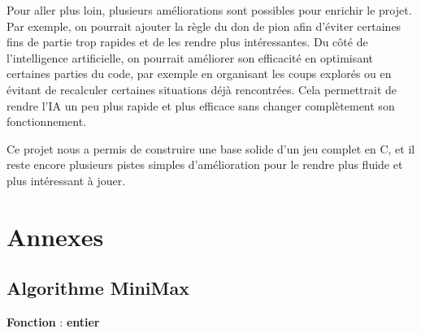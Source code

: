 \documentclass{article}
\begin{document}
Pour aller plus loin, plusieurs améliorations sont possibles pour enrichir le projet. Par exemple, on pourrait ajouter la règle du don de pion afin d'éviter certaines fins de partie trop rapides et de les rendre plus intéressantes. Du côté de l'intelligence artificielle, on pourrait  améliorer son efficacité en optimisant certaines parties du code, par exemple en organisant les coups explorés ou en évitant de recalculer certaines situations déjà rencontrées. Cela permettrait de rendre l'IA un peu plus rapide et plus efficace sans changer complètement son fonctionnement.

Ce projet nous a permis de construire une base solide d'un jeu complet en C, et il reste encore plusieurs pistes simples d'amélioration pour le rendre plus fluide et plus intéressant à jouer.

\section{\textbf{Annexes}}
\medskip

\subsection{Algorithme MiniMax}
\label{alg:minimax}

\begin{algorithm}[H]
\SetAlgoLined %
\DontPrintSemicolon %


\BlankLine
\textbf{Fonction}  : \textbf{entier}\;
\caption{Algorithme Minimax}
\end{algorithm}
\end{document}
